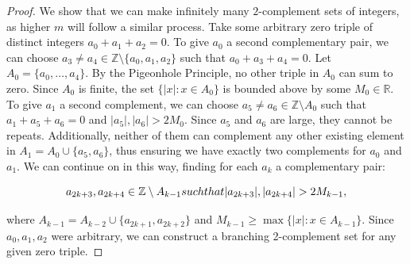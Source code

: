 \documentclass[10pt,a4paper]{amsart}
\newcommand{\R}{\mathbb{R}}
\newcommand{\Z}{\mathbb{Z}}
\begin{document}
\begin{proof}
    We show that we can make infinitely many $2$-complement sets of integers, as higher $m$ will follow a similar process. Take some arbitrary zero triple of distinct integers $a_0 + a_1 + a_2 = 0$. To give $a_0$ a second complementary pair, we can choose $a_3 \neq a_4 \in \Z \setminus \{a_0,a_1,a_2\}$ such that $a_0 + a_3 + a_4 = 0$. Let $A_0 = \{a_0,\dots,a_4\}$. By the Pigeonhole Principle, no other triple in $A_0$ can sum to zero. Since $A_0$ is finite, the set $\{|x| : x \in A_0\}$ is bounded above by some $M_0 \in \R$. To give $a_1$ a second complement, we can choose $a_5 \neq a_6 \in \Z \setminus A_0$ such that $a_1 + a_5 + a_6 = 0$ and $|a_5|,|a_6| > 2M_0$. Since $a_5$ and $a_6$ are large, they cannot be repeats. Additionally, neither of them can complement any other existing element in $A_1 = A_0 \cup \{a_5,a_6\}$, thus ensuring we have exactly two complements for $a_0$ and $a_1$. We can continue on in this way, finding for each $a_k$ a complementary pair:
    
    \[a_{2k+3},a_{2k+4} \in \Z \setminus A_{k-1} \textnormal{ such that } |a_{2k+3}|,|a_{2k+4}| > 2M_{k-1},\]
    
    where $A_{k-1} = A_{k-2} \cup \{a_{2k+1},a_{2k+2}\}$ and $M_{k-1} \geq \max\{|x| : x \in A_{k-1}\}$. Since $a_0,a_1,a_2$ were arbitrary, we can construct a branching 2-complement set for any given zero triple.
\end{proof}
\end{document}
